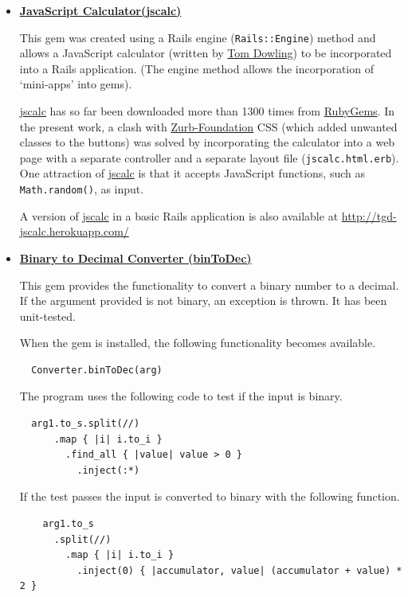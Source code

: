 \documentclass[11pt]{article}
\begin{document}
\begin{itemize}[itemsep=1ex,leftmargin=1cm,rightmargin=1cm]

\item[] \textbf{\href{https://rubygems.org/gems/jscalc}{JavaScript Calculator(jscalc)}}

This gem was created using a Rails engine 
(\verb|Rails::Engine|) method and
allows a JavaScript calculator (written by \href{http://mathematica.stackexchange.com/users/106/tomd}{Tom Dowling}) to be incorporated into a Rails application. 
(The engine method allows the incorporation of `mini-apps' into gems).

\href{https://rubygems.org/gems/jscalc}{jscalc}
 has so far been downloaded more than 1300 times from \href{https://rubygems.org/}{RubyGems}. 
In the present work, a clash with \href{http://zurb.com/}{Zurb-Foundation} CSS (which added unwanted classes to the buttons)
was solved by incorporating the calculator into a web page with a separate controller and a separate
layout file (\verb|jscalc.html.erb|). One attraction of 
\href{https://rubygems.org/gems/jscalc}{jscalc}
 is that it accepts JavaScript functions, 
such as \verb|Math.random()|, as input.

A version of \href{https://rubygems.org/gems/jscalc}{jscalc} in a basic Rails application is also available at
\url{http://tgd-jscalc.herokuapp.com/} 

\item[] \textbf{\href{https://rubygems.org/gems/binToDec}{Binary to Decimal Converter (binToDec)}}

This gem provides the functionality to convert a binary number to a decimal.
If the argument provided is not binary, an exception is thrown. It has been unit-tested. 

When the gem is installed, the following functionality becomes available.

\begin{verbatim}
  Converter.binToDec(arg)
\end{verbatim}

The program uses the following code to test if the input is binary.

\begin{verbatim}
  arg1.to_s.split(//)
      .map { |i| i.to_i }
        .find_all { |value| value > 0 }
          .inject(:*)
\end{verbatim}

If the test passes the input is converted to binary with the following function.
\begin{verbatim}
    arg1.to_s
      .split(//)
        .map { |i| i.to_i }
          .inject(0) { |accumulator, value| (accumulator + value) * 2 }


\end{verbatim}
\end{itemize}
\end{document}
